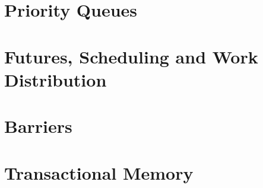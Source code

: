 \documentclass[letter,12pt]{report}
\begin{document}
\chapter{Priority Queues}







\chapter{Futures, Scheduling and Work Distribution}







\chapter{Barriers}







\chapter{Transactional Memory}





\end{document}
